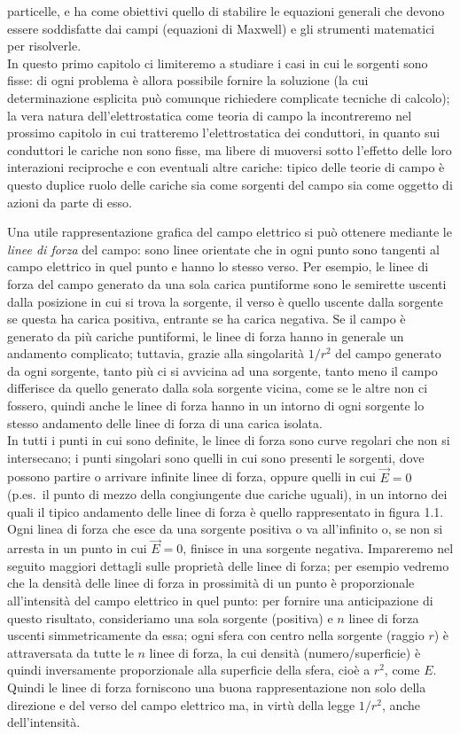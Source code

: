 particelle, e ha come obiettivi quello di stabilire le equazioni generali che
devono essere soddisfatte dai campi (equazioni di Maxwell) e gli strumenti
matematici per risolverle.\\
In questo primo capitolo ci limiteremo a studiare i casi in cui le sorgenti sono
fisse: di ogni problema \`e allora possibile fornire la soluzione (la cui
determinazione esplicita pu\`o comunque richiedere complicate tecniche di
calcolo); la vera natura dell'elettrostatica come teoria di campo la
incontreremo nel prossimo capitolo in cui tratteremo l'elettrostatica dei
conduttori, in quanto sui conduttori le cariche non sono fisse, ma libere di
muoversi sotto l'effetto delle loro interazioni reciproche e con eventuali altre
cariche: tipico delle teorie di campo \`e questo duplice ruolo delle cariche sia
come sorgenti del campo sia come oggetto di azioni da parte di esso.

Una utile rappresentazione grafica del campo elettrico si pu\`o ottenere
mediante le \emph{linee di forza} del campo: sono linee orientate che in ogni
punto sono tangenti al campo
elettrico in quel punto e hanno lo stesso verso. Per esempio, le linee di forza
del campo generato da una sola carica puntiforme sono le semirette uscenti dalla
posizione in cui si trova la sorgente, il verso \`e quello uscente dalla
sorgente se questa ha carica positiva, entrante se ha carica negativa. Se il
campo \`e generato da pi\`u cariche puntiformi, le linee di forza hanno in
generale un andamento complicato; tuttavia, grazie alla singolarit\`a $1/r^2$
del campo generato da ogni sorgente, tanto pi\`u ci si avvicina ad una sorgente,
tanto meno il campo differisce da quello generato dalla sola sorgente vicina,
come se le altre non ci fossero, quindi anche le linee di forza hanno in un
intorno di ogni sorgente lo stesso andamento delle linee di forza di una carica
isolata.\\
In tutti i punti in cui sono definite, le linee di forza sono curve regolari che
non si intersecano; i punti singolari sono quelli in cui sono presenti le
sorgenti, dove possono partire o arrivare infinite linee di forza, oppure quelli
in cui $\vec E=0$ (p.es.\ il punto di mezzo della congiungente due cariche
uguali), in un intorno dei quali il tipico andamento delle linee di forza \`e
quello rappresentato in figura 1.1.
Ogni linea di forza che esce da una sorgente positiva o va all'infinito o, se
non si arresta in un punto in cui $\vec E=0$, finisce in una sorgente negativa.
Impareremo nel seguito maggiori dettagli sulle propriet\`a delle linee di forza;
per esempio vedremo che la densit\`a delle linee di forza in prossimit\`a di un
punto \`e proporzionale all'intensit\`a del campo elettrico in quel punto: per
fornire una anticipazione di questo risultato, consideriamo una sola sorgente
(positiva) e $n$ linee di forza uscenti simmetricamente da essa; ogni sfera con
centro nella sorgente (raggio $r$) \`e attraversata da tutte le $n$ linee di
forza, la cui densit\`a (numero/superficie) \`e quindi inversamente
proporzionale alla superficie della sfera, cio\`e a $r^2$, come $E$. Quindi le
linee di forza forniscono una buona rappresentazione non solo della direzione e
del verso del campo elettrico ma, in virt\`u della legge $1/r^2$, anche
dell'intensit\`a.

